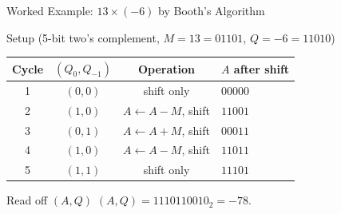 \documentclass[aspectratio=169]{beamer}
\begin{document}
\begin{frame}{Worked Example: $13 \times (-6)$ by Booth's Algorithm}
  \begin{block}{Setup (5-bit two's complement, $M=13=01101$, $Q=-6=11010$)}
    \small
    \begin{tabular}{@{}cccl@{}}
      \toprule
      Cycle & $(Q_0,Q_{-1})$ & Operation & $A$ after shift \\
      \midrule
      1 & $(0,0)$ & shift only & $00000$ \\
      2 & $(1,0)$ & $A\gets A-M$, shift & $11001$ \\
      3 & $(0,1)$ & $A\gets A+M$, shift & $00011$ \\
      4 & $(1,0)$ & $A\gets A-M$, shift & $11011$ \\
      5 & $(1,1)$ & shift only & $11101$ \\
      \bottomrule
    \end{tabular}
  \end{block}
  \begin{exampleblock}{Read off $(A,Q)$}
    $(A,Q) = 1110110010_2 = -78$. 
  \end{exampleblock}
\end{frame}
\end{document}
